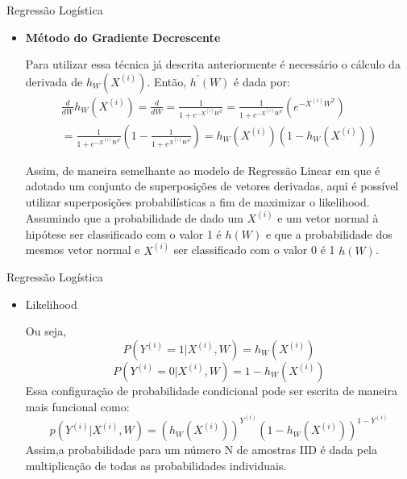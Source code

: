 \documentclass{beamer}
\begin{document}
  \begin{frame}{Regressão Logística}
  \begin{itemize}
  \item \textbf{Método do Gradiente Decrescente}
  
  Para utilizar essa técnica já descrita anteriormente é necessário o cálculo da derivada de $h_W(X^{(i)})$. Então, $h^{'}(W)$ é dada por:
  \begin{equation}
  \begin{split}
  \frac{d}{dW}h_W (X^{(i)}) = \frac{d}{dW} =\frac{1}{1 + e^{-X^{(i)}W^T}} = \frac{1}{1 + e^{-X^{(i)}W^T}}(e^{-X^{(i)}W^T})\\
  = \frac{1}{1 + e^{-X^{(i)}W^T}}\left( 1 - \frac{1}{1 + e^{X^{(i)}W^T}} \right) = h_W(X^{(i)})(1 - h_W(X^{(i)}))
  \end{split}
  \end{equation}
  
  Assim, de maneira semelhante ao modelo de Regressão Linear em que é adotado um conjunto de superposições de vetores derivadas, aqui é possível utilizar superposições probabilísticas a fim de maximizar o likelihood. Assumindo que a probabilidade de dado um $X^{(i)}$ e um vetor normal à hipótese ser classificado com o valor 1 é $h(W)$ e que a probabilidade dos mesmos vetor normal e $X^{(i)}$ ser classificado com o valor 0 é 1 \- $h(W)$. 
   \end{itemize}
   \end{frame}

   
  \begin{frame}{Regressão Logística}
  \begin{itemize}
  \item Likelihood
  
   Ou seja,
  \begin{equation*}
  P(Y^{(i)} = 1 | X^{(i)},W) =  h_W (X^{(i)})
  \end{equation*}
  \begin{equation*}
    P(Y^{(i)} = 0 | X^{(i)},W) = 1 - h_W (X^{(i)})
  \end{equation*}
  Essa configuração de probabilidade condicional pode ser escrita de maneira mais funcional como:
  \begin{equation}
  p(Y^{(i)}|X^{(i)},W) = (h_W(X^{(i)}))^{Y^{(i)}}(1 - h_W(X^{(i)}))^{1-Y^{(i)}}
  \end{equation}
  Assim,a probabilidade para um número N de amostras IID é dada pela multiplicação de todas as probabilidades individuais.  
  \end{itemize}
  \end{frame}
  
\end{document}
